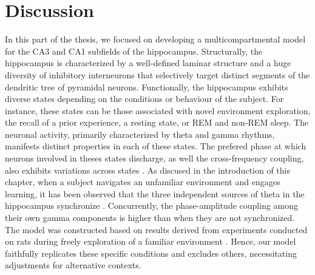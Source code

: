 \documentclass[../main.tex]{subfiles}
\begin{document}
\section{Discussion}
In this part of the thesis, we focused on developing a multicompartmental model for the CA3 and CA1 subfields of the hippocampus.
Structurally, the hippocampus is characterized by a well-defined laminar structure and a huge diversity of inhibitory interneurons that selectively target distinct segments of the dendritic tree of pyramidal neurons.
Functionally, the hippocampus exhibits diverse states depending on the conditions or behaviour of the subject.
For instance, these states can be those associated with novel environment exploration, the recall of a prior experience, a resting state, or REM and non-REM sleep.
The neuronal activity, primarily characterized by theta and gamma rhythms, manifests distinct properties in each of these states.
The prefered phase at which neurons involved in theses states discharge, as well the cross-frequency coupling, also exhibits variations across states \citep{lopez-madrona_different_2020}.
As discused in the introduction of this chapter, when a subject navigates an unfamiliar environment and engages learning, it has been observed that the three independent sources of theta in the hippocampus synchronize \cite{lopez-madrona_different_2020}.
Concurrently, the phase-amplitude coupling among their own gamma components is higher than when they are not synchronized.
The model was constructed based on results derived from experiments conducted on rats during freely exploration of a familiar environment \citep{mizuseki_theta_2009}.
Hence, our model faithfully replicates these specific conditions and excludes others, necessitating adjustments for alternative contexts.
\end{document}
